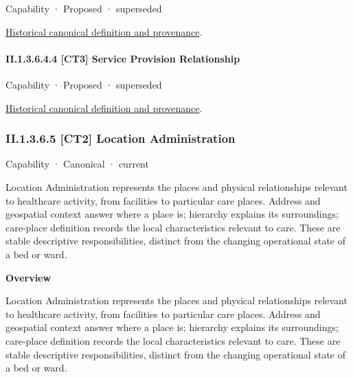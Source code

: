 \label{element:8a3f29e5948141e2a3d0c72539759daf}
{\small Capability · Proposed · superseded}\par
\href{../../../../continuum/strategy/capability/8a3f29e5948141e2a3d0c72539759daf.md}{Historical canonical definition and provenance}.\par
\paragraph*{II.1.3.6.4.4 [CT3] Service Provision Relationship}
\label{navigation:II.1.3.6.4.4}

\label{element:718ebe1fa8d44ad9a6632a5932277a8e}
{\small Capability · Proposed · superseded}\par
\href{../../../../continuum/strategy/capability/718ebe1fa8d44ad9a6632a5932277a8e.md}{Historical canonical definition and provenance}.\par
\subsubsection*{II.1.3.6.5 [CT2] Location Administration}
\label{navigation:II.1.3.6.5}

\label{element:c410005667444f99a221483bf577fad2}
{\small Capability · Canonical · current}\par

Location Administration represents the places and physical relationships relevant to healthcare activity, from facilities to particular care places. Address and geospatial context answer where a place is; hierarchy explains its surroundings; care-place definition records the local characteristics relevant to care. These are stable descriptive responsibilities, distinct from the changing operational state of a bed or ward.



\textbf{Overview}



Location Administration represents the places and physical relationships relevant to healthcare activity, from facilities to particular care places. Address and geospatial context answer where a place is; hierarchy explains its surroundings; care-place definition records the local characteristics relevant to care. These are stable descriptive responsibilities, distinct from the changing operational state of a bed or ward.



